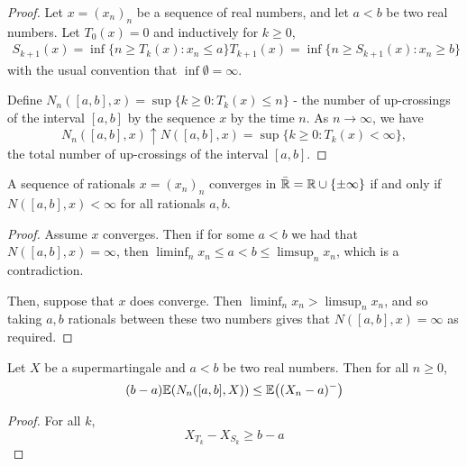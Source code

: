 \begin{proof}
  Let $x = (x_{n})_{n}$ be a sequence of real numbers, and let $a < b$
  be two real numbers.  Let $T_{0}(x) = 0$ and inductively for $k \geq
  0$,
  \begin{align}
    \label{eq:37}
    S_{k+1}(x) = \inf \{ n \geq T_{k}(x): x_{n} \leq a \}
    T_{k+1}(x) = \inf \{ n \geq S_{k+1}(x): x_{n} \geq b \}
  \end{align} with the usual convention that $\inf \emptyset =
  \infty$.

  Define $N_{n}([a, b], x) = \sup \{ k \geq 0 : T_{k}(x) \leq n \}$ -
  the number of up-crossings of the interval $[a, b]$ by the sequence
  $x$ by the time $n$. As $n \rightarrow \infty$, we have
  \begin{equation}
    \label{eq:38}
    N_{n}([a,b], x) \uparrow N([a, b], x) = \sup \{ k \geq 0 :
    T_{k}(x) < \infty \}, 
  \end{equation} the total number of up-crossings of the interval $[a, b]$.
\end{proof}

\begin{lem}
  A sequence of rationals $x = (x_{n})_{n}$ converges in $\bar {\mathbb{R}} = \mathbb{R}
  \cup \{ \pm \infty \}$ if and only if $N([a, b], x) < \infty$ for
  all rationals $a, b$.
\end{lem}

\begin{proof}
  Assume $x$ converges.  Then if for some $a < b$ we had that
  $N([a,b], x) = \infty$, then $\liminf_{n} x_{n} \leq a < b \leq
  \limsup_{n} x_{n}$, which is a contradiction.

  Then, suppose that $x$ does converge.  Then $\liminf_{n} x_{n} >
  \limsup_{n} x_{n}$, and so taking $a, b$ rationals between these two
  numbers gives that $N([a,b], x) = \infty$ as required.
\end{proof}

\begin{thm}
  \label{defn:discrete_time_martingales:10}
  Let $X$ be a supermartingale and $a < b$ be two real numbers. Then
  for all $n \geq 0$,
  \begin{equation}
    \label{eq:39}
    (b-a) \E{N_{n}([a, b], X)} \leq \E{(X_{n} - a)^{-}}
  \end{equation}
\end{thm}

\begin{proof}
  For all $k$,
  \begin{equation}
    \label{eq:40}
    X_{T_{k}} - X_{S_{k}} \geq b - a
  \end{equation}
\end{proof}

